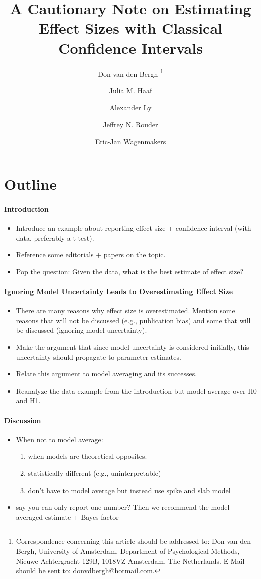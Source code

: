 \documentclass[a4paper]{article}
\title{A Cautionary Note on Estimating Effect Sizes with Classical Confidence Intervals}
\author[1]{Don van den Bergh%
	\thanks{Correspondence concerning this article should be addressed to: Don van den Bergh, University of Amsterdam, Department of Psychological Methods, Nieuwe Achtergracht 129B, 1018VZ Amsterdam, The Netherlands. E-Mail should be sent to: donvdbergh@hotmail.com.
}}
\author[1]{Julia M. Haaf}
\author[1,2]{Alexander Ly}
\author[3]{\authorcr Jeffrey N. Rouder} %
\author[1]{Eric-Jan Wagenmakers}
\affil[1]{University of Amsterdam}
\affil[2]{Centrum Wiskunde \& Informatica}
\affil[3]{University of California Irvine}
\date{}
\begin{document}
	\section*{Outline}
	
	\paragraph{Introduction}
	\begin{itemize}
		\item Introduce an example about reporting effect size + confidence interval (with data, preferably a t-test). 
		\item Reference some editorials + papers on the topic.
		\item Pop the question: Given the data, what is the best estimate of effect size?
	\end{itemize}
	\paragraph{Ignoring Model Uncertainty Leads to Overestimating Effect Size}
	\begin{itemize}
		\item There are many reasons why effect size is overestimated. Mention some reasons that will not be discussed (e.g., publication bias) and some that will be discussed (ignoring model uncertainty).
		\item Make the argument that since model uncertainty is considered initially, this uncertainty should propagate to parameter estimates.
		\item Relate this argument to model averaging and its successes.
		\item Reanalyze the data example from the introduction but model average over H0 and H1.
	\end{itemize}
	\paragraph{Discussion}
	\begin{itemize}
		\item When not to model average:
		\begin{enumerate}
			\item when models are theoretical opposites.
			\item statistically different (e.g., uninterpretable)
			\item don't have to model average but instead use spike and slab model
		\end{enumerate}
		\item say you can only report one number? Then we recommend the model averaged estimate + Bayes factor
	\end{itemize}
	
\end{document}
